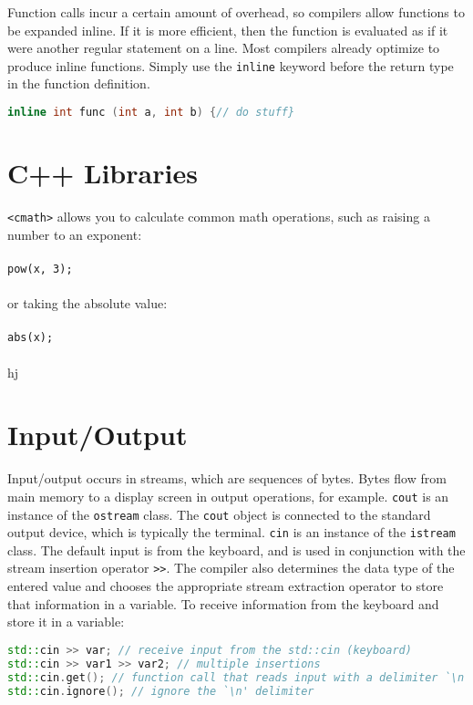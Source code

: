 \documentclass[10pt]{article}
\begin{document}
Function calls incur a certain amount of overhead, so compilers allow functions to be expanded inline. If it is more efficient, then the function is evaluated as if it were another regular statement on a line. Most compilers already optimize to produce inline functions. Simply use the \texttt{inline} keyword before the return type in the function definition.

\begin{lstlisting}[language=C++]
inline int func (int a, int b) {// do stuff}
\end{lstlisting}

\section{C++ Libraries}

\texttt{\textless cmath\textgreater} allows you to calculate common math operations, such as raising a number to an exponent:\\
\\
\color{red}\texttt{pow(x, 3);}\color{black}\\
\\
or taking the absolute value:\\
\\
\color{red}\texttt{abs(x);}\color{black}\\
\\
hj

\section{Input/Output}

Input/output occurs in streams, which are sequences of bytes. Bytes flow from main memory to a display screen in output operations, for example. \texttt{cout} is an instance of the \texttt{ostream} class. The \texttt{cout} object is connected to the standard output device, which is typically the terminal. \texttt{cin} is an instance of the \texttt{istream} class. The default input is from the keyboard, and is used in conjunction with the stream insertion operator \texttt{>>}. The compiler also determines the data type of the entered value and chooses the appropriate stream extraction operator to store that information in a variable. To receive information from the keyboard and store it in a variable:

\begin{lstlisting}[language=C++]
std::cin >> var; // receive input from the std::cin (keyboard)
std::cin >> var1 >> var2; // multiple insertions
std::cin.get(); // function call that reads input with a delimiter `\n'
std::cin.ignore(); // ignore the `\n' delimiter 
\end{lstlisting}
\end{document}
